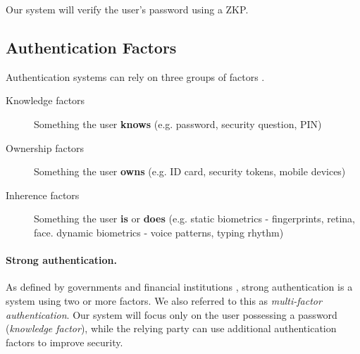 Our system will verify the user's password using a ZKP.

\subsection{Authentication Factors}

Authentication systems can rely on three groups of factors \cite{bignell2006authentication}.

\begin{description}
	\item [Knowledge factors] Something the user \textbf{knows} (e.g. password, security question, PIN)
	\item [Ownership factors] Something the user \textbf{owns} (e.g. ID card, security tokens, mobile devices)
	\item [Inherence factors] Something the user \textbf{is} or \textbf{does} (e.g. static biometrics - fingerprints, retina, face. dynamic biometrics - voice patterns, typing rhythm)
\end{description}

\paragraph{Strong authentication.}
As defined by governments and financial institutions \cite{cnss2006national, ecb2013recommendations}, strong authentication is a system using two or more factors. 
We also referred to this as \textit{multi-factor authentication}. Our system will focus only on the user possessing a password (\textit{knowledge factor}), while the relying party can use additional authentication factors to improve security.